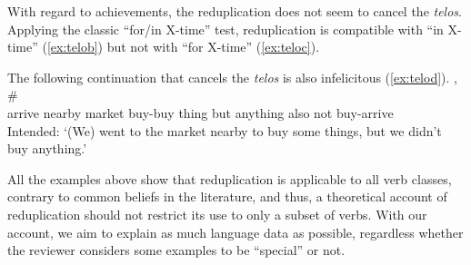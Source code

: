 \documentclass[fleqn,twoside]{article}
\begin{document}
\begin{enumerate}
With regard to achievements, the reduplication does not seem to cancel the \textit{telos}.
Applying the classic ``for/in X-time'' test, reduplication is compatible with ``in X-time'' (\ref{ex:telob}) but not with ``for X-time'' (\ref{ex:teloc}).
\ea
{}


\z\z
The following continuation that cancels the \textit{telos} is also infelicitous (\ref{ex:telod}).
\ea\label{ex:telod} %
\gll {}    , \#     \\
arrive nearby market buy-buy thing {} but anything also not buy-arrive\\
\glt Intended: `(We) went to the market nearby to buy some things, but we didn't buy anything.'
\z

All the examples above show that reduplication is applicable to all verb classes, contrary to common beliefs in the literature,
and thus, a theoretical account of reduplication should not restrict its use to only a subset of verbs.
With our account, we aim to explain as much language data as possible, regardless whether the reviewer considers some examples to be ``special'' or not.


\end{enumerate}
\end{document}
